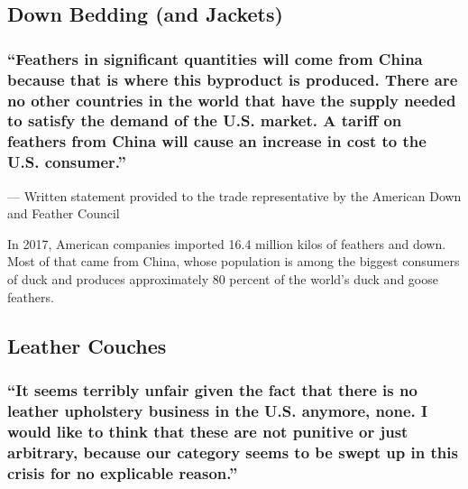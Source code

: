 \hypertarget{down-bedding-and-jackets}{%
\subsection{Down Bedding (and Jackets)}\label{down-bedding-and-jackets}}

\hypertarget{feathers-in-significant-quantities-will-come-from-china-because-that-is-where-this-byproduct-is-produced-there-are-no-other-countries-in-the-world-that-have-the-supply-needed-to-satisfy-the-demand-of-the-us-market-a-tariff-on-feathers-from-china-will-cause-an-increase-in-cost-to-the-us-consumer-}{%
\subsubsection{``Feathers in significant quantities will come from China
because that is where this byproduct is produced. There are no other
countries in the world that have the supply needed to satisfy the demand
of the U.S. market. A tariff on feathers from China will cause an
increase in cost to the U.S. consumer.''
}\label{feathers-in-significant-quantities-will-come-from-china-because-that-is-where-this-byproduct-is-produced-there-are-no-other-countries-in-the-world-that-have-the-supply-needed-to-satisfy-the-demand-of-the-us-market-a-tariff-on-feathers-from-china-will-cause-an-increase-in-cost-to-the-us-consumer-}}

--- Written statement provided to the trade representative by the
American Down and Feather Council

In 2017, American companies imported 16.4 million kilos of feathers and
down. Most of that came from China, whose population is among the
biggest consumers of duck and produces approximately 80 percent of the
world's duck and goose feathers.

\hypertarget{leather-couches}{%
\subsection{Leather Couches}\label{leather-couches}}

\hypertarget{it-seems-terribly-unfair-given-the-fact-that-there-is-no-leather-upholstery-business-in-the-us-anymore-none-i-would-like-to-think-that-these-are-not-punitive-or-just-arbitrary-because-our-category-seems-to-be-swept-up-in-this-crisis-for-no-explicable-reason}{%
\subsubsection{``It seems terribly unfair given the fact that there is
no leather upholstery business in the U.S. anymore, none. I would like
to think that these are not punitive or just arbitrary, because our
category seems to be swept up in this crisis for no explicable
reason.''}\label{it-seems-terribly-unfair-given-the-fact-that-there-is-no-leather-upholstery-business-in-the-us-anymore-none-i-would-like-to-think-that-these-are-not-punitive-or-just-arbitrary-because-our-category-seems-to-be-swept-up-in-this-crisis-for-no-explicable-reason}}

